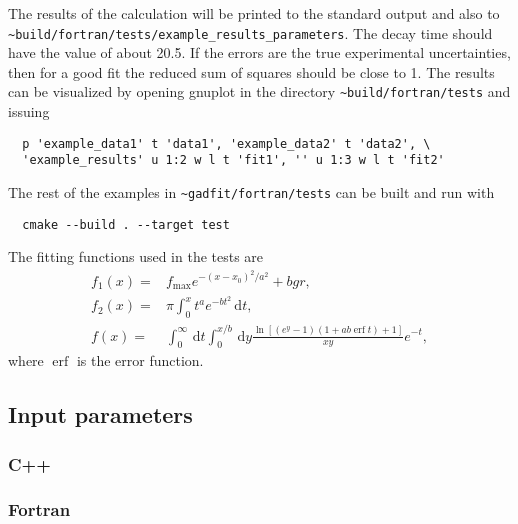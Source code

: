 \documentclass{article}
\newcommand{\D}{\,\textrm{d}}
\DeclareMathOperator{\erf}{erf}
\begin{document}
The results of the calculation will be printed to the standard output and also to \verb+~build/fortran/tests/example_results_parameters+. The decay time should have the value of about 20.5. If the errors are the true experimental uncertainties, then for a good fit the reduced sum of squares should be close to 1. The results can be visualized by opening gnuplot in the directory \verb+~build/fortran/tests+ and issuing
\begin{verbatim}
  p 'example_data1' t 'data1', 'example_data2' t 'data2', \
  'example_results' u 1:2 w l t 'fit1', '' u 1:3 w l t 'fit2'
\end{verbatim}
The rest of the examples in \verb+~gadfit/fortran/tests+ can be built and run with
\begin{verbatim}
  cmake --build . --target test
\end{verbatim}
The fitting functions used in the tests are
\begin{equation*}
  \begin{split}
    f_1(x) =& f_{\text{max}}e^{-(x-x_0)^2/a^2}+bgr, \\
    f_2(x) =& \pi \int_0^x t^ae^{-bt^2} \D t, \\
    f(x) =& \int_0^\infty \D t \int_0^{x/b} \D y
    \frac{\ln[(e^y-1)(1+ab \erf t)+1]}{xy} e^{-t},
  \end{split}
\end{equation*}
where $\erf$ is the error function.

\subsection{Input parameters}

\subsubsection{C++}

\subsubsection{\label{sec:input_fortran}Fortran}
\end{document}
